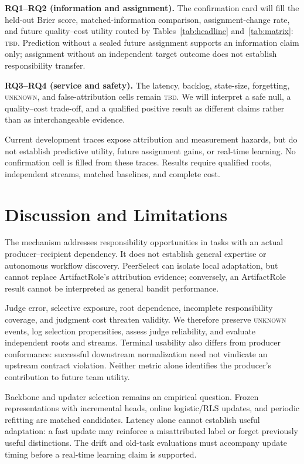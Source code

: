 \documentclass[sigconf,anonymous]{aamas}
\newcommand{\unknown}{\textsc{unknown}}
\begin{document}
\textbf{RQ1--RQ2 (information and assignment).} The confirmation card will fill the held-out Brier score, matched-information comparison, assignment-change rate, and future quality--cost utility routed by Tables~\ref{tab:headline} and~\ref{tab:matrix}: \textsc{tbd}. Prediction without a sealed future assignment supports an information claim only; assignment without an independent target outcome does not establish responsibility transfer.

\textbf{RQ3--RQ4 (service and safety).} The latency, backlog, state-size, forgetting, \unknown{}, and false-attribution cells remain \textsc{tbd}. We will interpret a safe null, a quality--cost trade-off, and a qualified positive result as different claims rather than as interchangeable evidence.

Current development traces expose attribution and measurement hazards, but do not establish predictive utility, future assignment gains, or real-time learning. No confirmation cell is filled from these traces. Results require qualified roots, independent streams, matched baselines, and complete cost.

\section{Discussion and Limitations}

The mechanism addresses responsibility opportunities in tasks with an actual producer--recipient dependency. It does not establish general expertise or autonomous workflow discovery. PeerSelect can isolate local adaptation, but cannot replace ArtifactRole's attribution evidence; conversely, an ArtifactRole result cannot be interpreted as general bandit performance.

Judge error, selective exposure, root dependence, incomplete responsibility coverage, and judgment cost threaten validity. We therefore preserve \unknown{} events, log selection propensities, assess judge reliability, and evaluate independent roots and streams. Terminal usability also differs from producer conformance: successful downstream normalization need not vindicate an upstream contract violation. Neither metric alone identifies the producer's contribution to future team utility.

Backbone and updater selection remains an empirical question. Frozen representations with incremental heads, online logistic/RLS updates, and periodic refitting are matched candidates. Latency alone cannot establish useful adaptation: a fast update may reinforce a misattributed label or forget previously useful distinctions. The drift and old-task evaluations must accompany update timing before a real-time learning claim is supported.
\end{document}
